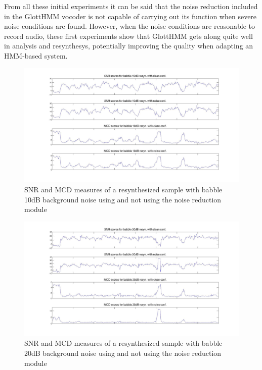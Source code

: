 From all these initial experiments it can be said that the noise reduction included in the GlottHMM vocoder is not capable of carrying out its function when severe noise conditions are found.
%
However, when the noise conditions are reasonable to record audio, these first experiments show that GlottHMM gets along quite well in analysis and resynthesys, potentially improving the quality when adapting an HMM-based system. 

\begin{figure}[!htb]
\begin{adjustwidth}{-2.6cm}{}
\includegraphics[width=1.3\textwidth]{images/babble10clean_vs_noise.jpg}
\end{adjustwidth}
\caption{SNR and MCD measures of a resynthesized sample with babble 10dB background noise using and not using the noise reduction module}
\label{fig:babble10_clean_vs_noise}
\end{figure}

\begin{figure}[!hb]
\begin{adjustwidth}{-2.6cm}{}
\includegraphics[width=1.3\textwidth]{images/babble20clean_vs_noise.jpg}
\end{adjustwidth}
\caption{SNR and MCD measures of a resynthesized sample with babble 20dB background noise using and not using the noise reduction module}
\label{fig:babble20_clean_vs_noise}
\end{figure}

